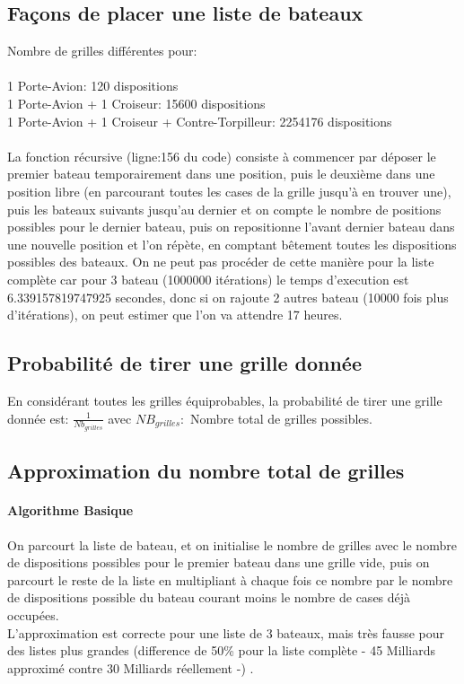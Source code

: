 \documentclass[12pt]{article}
\begin{document}
        \subsection{Façons de placer une liste de bateaux}
            Nombre de grilles différentes pour:\\\\
                1 Porte-Avion: 120 dispositions \\
                1 Porte-Avion + 1 Croiseur: 15600 dispositions \\
                1 Porte-Avion + 1 Croiseur + Contre-Torpilleur: 2254176 dispositions \\\\
                La fonction récursive (ligne:156 du code) consiste à commencer par déposer le premier bateau temporairement dans une position, puis le deuxième dans une position libre (en parcourant toutes les cases de la grille jusqu'à en trouver une), puis les bateaux suivants jusqu'au dernier et on compte le nombre de positions possibles pour le dernier bateau, puis on repositionne l'avant dernier bateau dans une nouvelle position et l'on répète, en comptant bêtement toutes les dispositions possibles des bateaux.
                On ne peut pas procéder de cette manière pour la liste complète car pour 3 bateau (1000000 itérations) le temps d'execution est 6.339157819747925 secondes, donc si on rajoute 2 autres bateau (10000 fois plus d'itérations), on peut estimer que l'on va attendre 17 heures.
            
    \subsection{Probabilité de tirer une grille donnée}
        En considérant toutes les grilles équiprobables, la probabilité de tirer une grille donnée est: $\frac{1}{Nb_{grilles}}$ avec $NB_{grilles}:$ Nombre total de grilles possibles.
    \subsection{Approximation du nombre total de grilles}
        \paragraph{Algorithme Basique}
            On parcourt la liste de bateau, et on initialise le nombre de grilles avec le nombre de dispositions possibles pour le premier bateau dans une grille vide, puis on parcourt le reste de la liste en multipliant à chaque fois ce nombre par le nombre de dispositions possible du bateau courant moins le nombre de cases déjà occupées.\\
            L'approximation est correcte pour une liste de 3 bateaux, mais très fausse pour des listes plus grandes (difference de 50\% pour la liste complète - 45 Milliards approximé contre 30 Milliards réellement -) .
\end{document}
